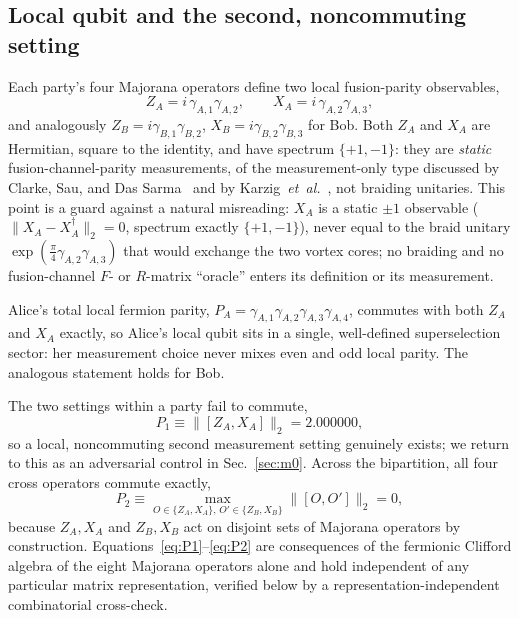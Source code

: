 \documentclass[aps,pra,twocolumn,superscriptaddress,floatfix,nofootinbib]{revtex4-2}
\begin{document}
\subsection{Local qubit and the second, noncommuting setting}
\label{sec:algebra}

Each party's four Majorana operators define two local fusion-parity
observables,
\begin{equation}
\label{eq:ZAXA}
Z_A = i\,\gamma_{A,1}\gamma_{A,2}, \qquad
X_A = i\,\gamma_{A,2}\gamma_{A,3},
\end{equation}
and analogously $Z_B=i\gamma_{B,1}\gamma_{B,2}$,
$X_B=i\gamma_{B,2}\gamma_{B,3}$ for Bob. Both $Z_A$ and $X_A$ are
Hermitian, square to the identity, and have spectrum $\{+1,-1\}$: they
are \emph{static} fusion-channel-parity measurements, of the
measurement-only type discussed by Clarke, Sau, and Das
Sarma~\cite{ClarkeSauDasSarma2016} and by
Karzig~\emph{et~al.}~\cite{Karzig2017}, not braiding unitaries. This
point is a guard against a natural misreading: $X_A$ is a static
$\pm1$ observable ($\lVert X_A-X_A^\dagger\rVert_2=0$, spectrum exactly
$\{+1,-1\}$), never equal to the braid unitary
$\exp(\tfrac{\pi}{4}\gamma_{A,2}\gamma_{A,3})$ that would exchange the
two vortex cores; no braiding and no fusion-channel $F$- or
$R$-matrix ``oracle'' enters its definition or its measurement.

Alice's total local fermion parity,
$P_A=\gamma_{A,1}\gamma_{A,2}\gamma_{A,3}\gamma_{A,4}$, commutes with
both $Z_A$ and $X_A$ exactly, so Alice's local qubit sits in a single,
well-defined superselection sector: her measurement choice never mixes
even and odd local parity. The analogous statement holds for Bob.

The two settings within a party fail to commute,
\begin{equation}
\label{eq:P1}
P_1 \equiv \lVert[Z_A,X_A]\rVert_2 = 2.000000,
\end{equation}
so a local, noncommuting second measurement setting genuinely exists;
we return to this as an adversarial control in Sec.~\ref{sec:m0}.
Across the bipartition, all four cross operators commute exactly,
\begin{equation}
\label{eq:P2}
P_2 \equiv \max_{O\in\{Z_A,X_A\},\,O'\in\{Z_B,X_B\}} \lVert[O,O']\rVert_2 = 0,
\end{equation}
because $Z_A,X_A$ and $Z_B,X_B$ act on disjoint sets of Majorana
operators by construction. Equations~\eqref{eq:P1}--\eqref{eq:P2} are
consequences of the fermionic Clifford algebra of the eight Majorana
operators alone and hold independent of any particular matrix
representation, verified below by a representation-independent
combinatorial cross-check.
\end{document}
